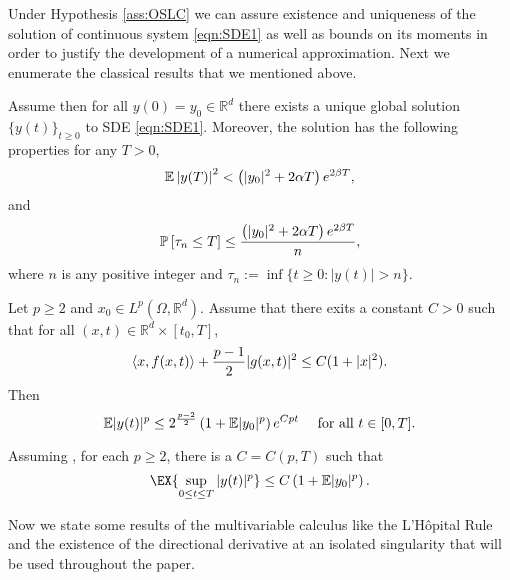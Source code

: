 Under Hypothesis \ref{ass:OSLC} we can assure  existence and uniqueness 
of the solution of continuous system \eqref{eqn:SDE1}  as well as bounds on its moments
 in order to justify the development of a numerical approximation. Next we enumerate the classical 
 results that we mentioned above.
%
\begin{thm}
	Assume   then for all $y(0)=y_0\in \mathbb{R}^d$   there exists a 
	unique global solution $\{y(t)\}_{t\geq 0}$ to SDE \eqref{eqn:SDE1}. Moreover, the solution has the 
	following properties for any $T>0$,
	\begin{equation*}
		\mathbb{E}\left|y(T)\right|^2< 
		\left(
			|y_0|^2 +2\alpha T 
		\right)e^{2\beta T},
	\end{equation*}
	and
	\begin{equation*}
	\mathbb{P}\left[\tau_n\leq T\right]
	\leq \frac{
		\left(
		|y_0|^2 +2\alpha T 
		\right)
		e^{2\beta T}
	}{n},
	\end{equation*}
	where $n$ is any positive integer and 
	$\tau_n := \inf \{ t\geq 0 : |y(t)|>n\}$.
\end{thm}
%
\begin{thm}
	\label{thm:MaoCoercive}
	Let $p\geq 2$ and $x_0\in L^p(\Omega, \mathbb{R}^d)$. Assume that there exits a constant $C>0$
	such that for all $(x,t)\in \mathbb{R}^d\times [t_0,T]$,
	\begin{equation*}
	\left\langle x, f(x,t)\right\rangle+\frac{p-1}{2}|g(x,t)|^2 \leq C(1+|x|^2).
	\end{equation*}
	Then
	\begin{equation*}
	\mathbb{E}|y(t)|^p
	\leq
	2^{\frac{p-2}{2}}
	\left(
	1 + \mathbb{E}|y_0|^p
	\right)e^{Cpt} \quad \text{ for all } t\in[0,T].
	\end{equation*}
\end{thm}
%
\begin{lem}
	\label{lem:MomentBound}
	Assuming , for each $p\geq 2$, there is a $C=C(p,T)$ such that
	\begin{equation*}
	\EX{\sup_{0\leq t \leq T}|y(t)|^p}\leq C \left(1+\mep{y_0}\right).
	\end{equation*}
\end{lem}

Now we  state some  results of the multivariable calculus  like  
the L'H\^{o}pital Rule and the existence  of the directional derivative 
at an isolated singularity that will be used  throughout the paper.

